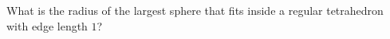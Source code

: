 What is the radius of the largest sphere that fits inside a regular tetrahedron with edge length $1$?
